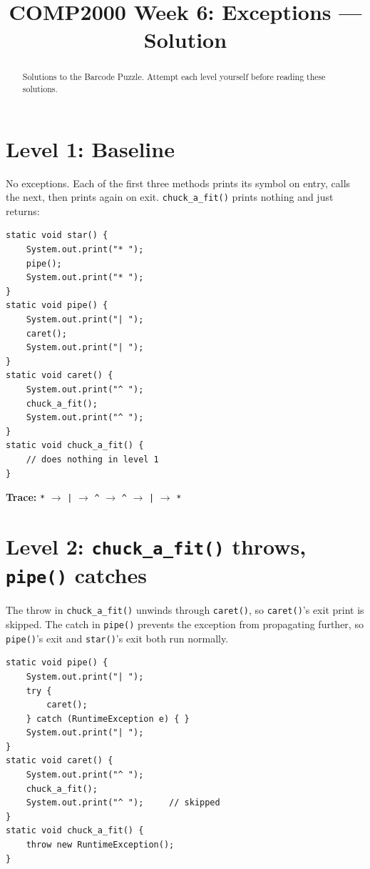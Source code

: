 \documentclass[twoside=false,DIV=14]{scrartcl}
\title{\color{redish} \vspace{-1em}COMP2000 Week 6: Exceptions --- Solution}
\begin{document}
{\color{blackish}\maketitle}\vspace{-7em}

\begin{abstract}
Solutions to the Barcode Puzzle.  Attempt each level yourself before reading these solutions.
\end{abstract}

\section*{Level 1: Baseline}

No exceptions.  Each of the first three methods prints its symbol on entry, calls the next, then prints again on exit.  \texttt{chuck\_a\_fit()} prints nothing and just returns:

\begin{lstlisting}
static void star() {
    System.out.print("* ");
    pipe();
    System.out.print("* ");
}
static void pipe() {
    System.out.print("| ");
    caret();
    System.out.print("| ");
}
static void caret() {
    System.out.print("^ ");
    chuck_a_fit();
    System.out.print("^ ");
}
static void chuck_a_fit() {
    // does nothing in level 1
}
\end{lstlisting}

\textbf{Trace:} \texttt{*}
 $\rightarrow$ \texttt{|} $\rightarrow$ \texttt{\^{}} $\rightarrow$ \texttt{\^{}} $\rightarrow$ \texttt{|} $\rightarrow$ \texttt{*}

\section*{Level 2: \texttt{chuck\_a\_fit()} throws, \texttt{pipe()} catches}

The throw in \texttt{chuck\_a\_fit()} unwinds through \texttt{caret()}, so \texttt{caret()}'s exit print is skipped.  The catch in \texttt{pipe()} prevents the exception from propagating further, so \texttt{pipe()}'s exit and \texttt{star()}'s exit both run normally.

\begin{lstlisting}
static void pipe() {
    System.out.print("| ");
    try {
        caret();
    } catch (RuntimeException e) { }
    System.out.print("| ");
}
static void caret() {
    System.out.print("^ ");
    chuck_a_fit();
    System.out.print("^ ");     // skipped
}
static void chuck_a_fit() {
    throw new RuntimeException();
}
\end{lstlisting}
\end{document}
